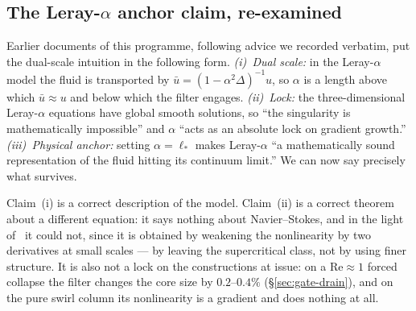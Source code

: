 \documentclass[11pt,a4paper]{article}
\begin{document}
\subsection{The Leray-\texorpdfstring{$\alpha$}{alpha} anchor claim, re-examined}
\label{sec:leray-claim}

Earlier documents of this programme, following advice we recorded verbatim, put the dual-scale
intuition in the following form. \emph{(i)~Dual scale:} in the Leray-$\alpha$ model the fluid is
transported by $\bar u=(1-\alpha^2\Delta)^{-1}u$, so $\alpha$ is a length above which $\bar u\approx u$
and below which the filter engages. \emph{(ii)~Lock:} the three-dimensional Leray-$\alpha$ equations
have global smooth solutions, so ``the singularity is mathematically impossible'' and $\alpha$ ``acts
as an absolute lock on gradient growth.'' \emph{(iii)~Physical anchor:} setting $\alpha=\ell_*$ makes
Leray-$\alpha$ ``a mathematically sound representation of the fluid hitting its continuum limit.''
We can now say precisely what survives.

Claim~(i) is a correct description of the model. Claim~(ii) is a correct
theorem~\cite{FHT2001,CHOT2005} about a different equation: it says nothing about
Navier--Stokes, and in the light of~\cite{Tao2016} it could not, since it is obtained by weakening
the nonlinearity by two derivatives at small scales --- by leaving the supercritical class, not by
using finer structure. It is also not a lock on the constructions at issue: on a
$\mathrm{Re}\approx1$ forced collapse the filter changes the core size by $0.2$--$0.4\%$
(\S\ref{sec:gate-drain}), and on the pure swirl column its nonlinearity is a gradient and does
nothing at all.
\end{document}
